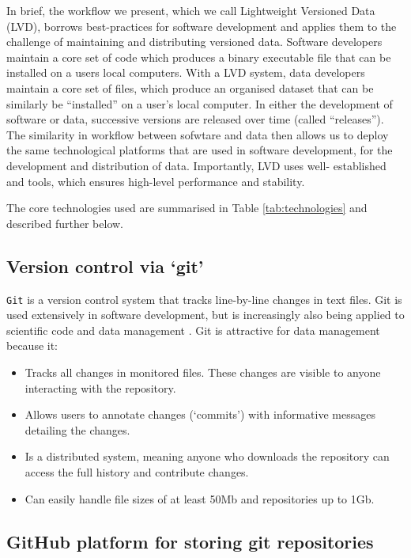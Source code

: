 \documentclass[a4paper,11pt]{article}
\begin{document}
In brief, the workflow we present, which we call Lightweight Versioned Data (LVD), borrows best-practices for software
development and applies them to the challenge of maintaining and distributing
versioned data. Software developers maintain a core set of code which produces
a binary executable file that can be installed on a users local  computers. With a LVD system, data developers maintain a core set of files, which produce an
organised dataset that can be similarly be ``installed'' on a user's local
computer. In either the development of software or data, successive versions
are released over time (called ``releases''). The similarity in workflow
between sofwtare and data then allows us to deploy the same technological
platforms that are used in software development, for the development and
distribution of data. Importantly, LVD uses well-
established and tools, which ensures high-level performance and stability.

The core technologies used are summarised in Table \ref{tab:technologies} and
described further below.

\subsection{Version control via `git'}

\texttt{Git} is a version control system that tracks line-by-line changes in text
files. Git is used extensively in software development, but is increasingly
also being applied to scientific code and data management \citep{Ram-2013,
Perkel-2016}. Git is attractive for data management because it: 
\begin{itemize}
  \item Tracks all changes in monitored files. These changes are visible to
  anyone interacting with the repository.
  \item Allows users to annotate changes (`commits') with informative messages
  detailing the changes.
  \item Is a distributed system, meaning anyone who downloads the repository
  can access the full history and contribute changes.
  \item Can easily handle file sizes of at least 50Mb and repositories up to 1Gb.
\end{itemize}

\subsection{GitHub platform for storing git repositories}
\end{document}
